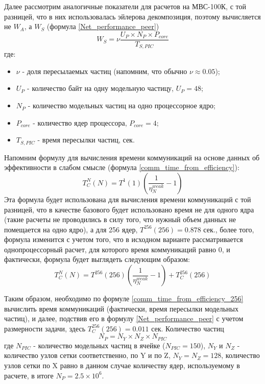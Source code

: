 Далее рассмотрим аналогичные показатели для расчетов на МВС-100К, с той разницей, что в них использовалась эйлерова декомпозиция, поэтому вычисляется не $W_A$, а $W_S$ (формула \ref{Net_performance_peer})
$$
W_S = \nu \frac{U_P\times  N_P \times P_{core}}{T_{S,PIC}}
$$
где:
\begin{itemize}
    \item $\nu$ - доля пересылаемых частиц (напомним, что обычно $\nu \approx 0.05$);
	\item $U_P$ - количество байт на одну модельную частицу, $U_P = 48$;
	\item $N_P$ - количество модельных частиц на одно процессорное ядро;  
	\item $P_{core}$ - количество ядер процессора, $P_{core} = 4$;

	\item $T_{S,PIC}$  - время пересылки частиц, сек.
\end{itemize}

Напомним формулу для вычисления времени коммуникаций на основе данных об эффективности в слабом смысле (формула \ref{comm_time_from_efficiency}):
$$
T^N_{C}(N) = T^1(1) \left(\frac{1}{\eta^{weak}_N} - 1\right)
$$
Эта формула будет использована для вычисления времени коммуникаций с той разницей, что в качестве базового будет использовано время не для одного ядра (такие расчеты не проводились в силу того, что нужный объем данных не помещается на одно ядро), а для 256 ядер,  $T^{256}(256) = 0.878$ сек., более того, формула изменится с учетом того, что в исходном варианте рассматривается однопроцессорный расчет, для которого время коммуникаций равно 0, и фактически, формула будет выглядеть следующим образом:
\begin{equation}
T^N_{C}(N) = T^256(256) \left(\frac{1}{\eta^{weak}_N} - 1\right) + T^{256}_C(256)
\label{comm_time_from_efficiency_256}
\end{equation}

Таким образом, необходимо по формуле \ref{comm_time_from_efficiency_256} вычислить время коммуникаций (фактически, время пересылки модельных частиц), и далее, подствив его в формулу  \ref{Net_performance_peer} с учетом размерности задачи, здесь $ T^{256}_C(256) = 0.011$ сек.
Количество частиц 
$$
N_P = N_Y\times N_Z\times N_{PIC}
$$
где $N_{PIC}$ - количество модельных частиц в ячейке ($N_{PIC} = 150$), $N_Y$ и $N_Z$ - количество узлов сетки соответственно, по Y и по Z, $N_Y = N_Z = 128$, количество узлов сетки по  X равно в данном случае количеству ядер, используемому в расчете, в итоге $N_P = 2.5\times 10^6$.


